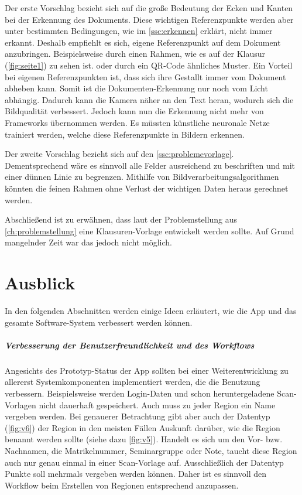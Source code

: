 \documentclass[notables, nomenclature, oneside, 150]{HSMW-Thesis}
\begin{document}
		Der erste Vorschlag bezieht sich auf die große Bedeutung der Ecken und Kanten bei der Erkennung des Dokuments. Diese wichtigen Referenzpunkte werden aber unter bestimmten Bedingungen, wie im \autoref{ssc:erkennen} erklärt, nicht immer erkannt. Deshalb empfiehlt es sich, eigene Referenzpunkt auf dem Dokument anzubringen. Beispielsweise durch einen Rahmen, wie es auf der Klausur (\ref{fig:seite1}) zu sehen ist. oder durch ein QR-Code ähnliches Muster. Ein Vorteil bei eigenen Referenzpunkten ist, dass sich ihre Gestallt immer vom Dokument abheben kann. Somit ist die Dokumenten-Erkennung nur noch vom Licht abhängig. Dadurch kann die Kamera näher an den Text heran, wodurch sich die Bildqualität verbessert. Jedoch kann nun die Erkennung nicht mehr von Frameworks übernommen werden. Es müssten künstliche neuronale Netze trainiert werden, welche diese Referenzpunkte in Bildern erkennen. 
	
		Der zweite Vorschlag bezieht sich auf den \autoref{ssc:problemevorlage}. Dementsprechend wäre es sinnvoll alle Felder ausreichend zu beschriften und mit einer dünnen Linie zu begrenzen. Mithilfe von Bildverarbeitungsalgorithmen könnten die feinen Rahmen ohne Verlust der wichtigen Daten heraus gerechnet werden.
		
		Abschließend ist zu erwähnen, dass laut der Problemstellung aus \autoref{ch:problemstellung} eine Klausuren-Vorlage entwickelt werden sollte. Auf Grund mangelnder Zeit war das jedoch nicht möglich.

		
\chapter{Ausblick}\label{ch:ausblick}
	In den folgenden Abschnitten werden einige Ideen erläutert, wie die App und das gesamte Software-System verbessert werden können.
	
	\paragraph*{Verbesserung der Benutzerfreundlichkeit und des Workflows} \label{pa:benutzer} 
		Angesichts des Prototyp-Status der App sollten bei einer Weiterentwicklung zu allererst Systemkomponenten implementiert werden, die die Benutzung verbessern. Beispielsweise werden Login-Daten und schon heruntergeladene Scan-Vorlagen nicht dauerhaft gespeichert. Auch muss zu jeder Region ein Name vergeben werden. Bei genauerer Betrachtung gibt aber auch der Datentyp (\ref{fig:v6}) der Region in den meisten Fällen Auskunft darüber, wie die Region benannt werden sollte (siehe dazu \autoref{fig:v5}). Handelt es sich um den Vor- bzw. Nachnamen, die Matrikelnummer, Seminargruppe oder Note, taucht diese Region auch nur genau einmal in einer Scan-Vorlage auf. Ausschließlich der Datentyp Punkte soll mehrmals vergeben werden können. Daher ist es sinnvoll den Workflow beim Erstellen von Regionen entsprechend anzupassen. 
	
\end{document}
